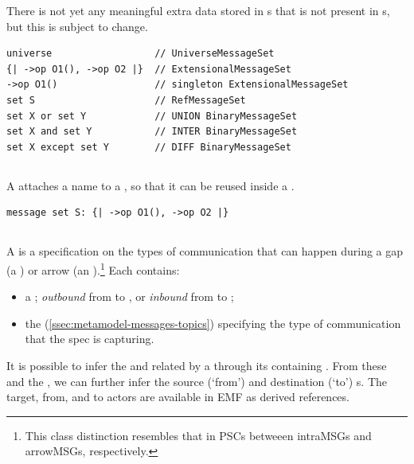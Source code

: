 There is not yet any meaningful extra data stored in
\mgapmessagespec s that is not present in \mmessagespec s, but this is subject
to change.

\begin{lstlisting}[style=Example]
universe                  // UniverseMessageSet
{| ->op O1(), ->op O2 |}  // ExtensionalMessageSet
->op O1()                 // singleton ExtensionalMessageSet
set S                     // RefMessageSet
set X or set Y            // UNION BinaryMessageSet
set X and set Y           // INTER BinaryMessageSet
set X except set Y        // DIFF BinaryMessageSet
\end{lstlisting}

\subsection{\mnamedmessageset}\label{ssec:metamodel-messages-named-sets}

A \mnamedmessageset{} attaches a name to a \mmessageset, so that it can be reused
inside a \msequence.

\begin{lstlisting}[style=Example]
message set S: {| ->op O1(), ->op O2 |}
\end{lstlisting}

\subsection{\mmessagespec}

A \mmessagespec{} is a specification on the types of communication that can
happen during a gap (a \mgapmessagespec) or arrow (an \marrowmessagespec).\footnote{
This class distinction resembles that in PSCs betweeen intraMSGs and arrowMSGs,
respectively.}  Each \mmessagespec{} contains:

\begin{itemize}
\item
  a \mmessagedirection; \emph{outbound} from \mtarget{} to \mworld,
  or \emph{inbound} from \mworld{} to \mtarget;
\item
  the \mmessagetopic{} (\cref{ssec:metamodel-messages-topics}) specifying
  the type of communication that the spec is capturing.
\end{itemize}

It is possible to infer the \mtarget{} and \mworld{} related by a
\mmessagespec{} through its containing \msequencegroup.  From these
and the \mmessagedirection, we can further infer the source (`from')
and destination (`to') \mactor s.  The target, from, and to actors are
available in EMF as derived references.


